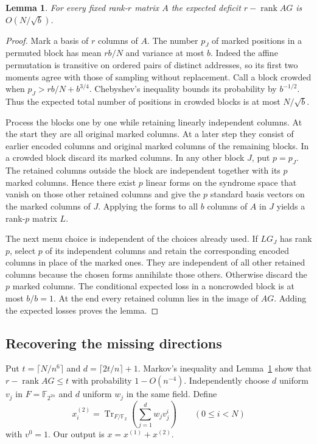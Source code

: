 \documentclass[11pt]{article}
\newtheorem{lemma}[theorem]{Lemma}
\newcommand{\F}{\mathbb F_2}
\newcommand{\rank}{\operatorname{rank}}
\begin{document}
\begin{lemma}\label{lem:local}
For every fixed rank-$r$ matrix $A$ the expected deficit $r-\rank AG$ is $O(N/\sqrt b)$.
\end{lemma}
\begin{proof}
Mark a basis of $r$ columns of $A$. The number $p_J$ of marked positions in a permuted block has mean $rb/N$ and variance at most $b$. Indeed the affine permutation is transitive on ordered pairs of distinct addresses, so its first two moments agree with those of sampling without replacement. Call a block crowded when $p_J>rb/N+b^{3/4}$. Chebyshev's inequality bounds its probability by $b^{-1/2}$. Thus the expected total number of positions in crowded blocks is at most $N/\sqrt b$.

Process the blocks one by one while retaining linearly independent columns. At the start they are all original marked columns. At a later step they consist of earlier encoded columns and original marked columns of the remaining blocks. In a crowded block discard its marked columns. In any other block $J$, put $p=p_J$. The retained columns outside the block are independent together with its $p$ marked columns. Hence there exist $p$ linear forms on the syndrome space that vanish on those other retained columns and give the $p$ standard basis vectors on the marked columns of $J$. Applying the forms to all $b$ columns of $A$ in $J$ yields a rank-$p$ matrix $L$.

The next menu choice is independent of the choices already used. If $LG_J$ has rank $p$, select $p$ of its independent columns and retain the corresponding encoded columns in place of the marked ones. They are independent of all other retained columns because the chosen forms annihilate those others. Otherwise discard the $p$ marked columns. The conditional expected loss in a noncrowded block is at most $b/b=1$. At the end every retained column lies in the image of $AG$. Adding the expected losses proves the lemma.
\end{proof}

\subsection{Recovering the missing directions}
Put $t=\lceil N/n^6\rceil$ and $d=\lceil 2t/n\rceil+1$. Markov's inequality and Lemma~\ref{lem:local} show that $r-\rank AG\le t$ with probability $1-O(n^{-4})$. Independently choose $d$ uniform $v_j$ in $F=\mathbb F_{2^{2n}}$ and $d$ uniform $w_j$ in the same field. Define
\[
              x^{(2)}_i=\operatorname{Tr}_{F/\F}
                               \left(\sum_{j=1}^d w_jv_j^i\right)
              \qquad(0\le i<N)
\]
with $v^0=1$. Our output is $x=x^{(1)}+x^{(2)}$.
\end{document}
